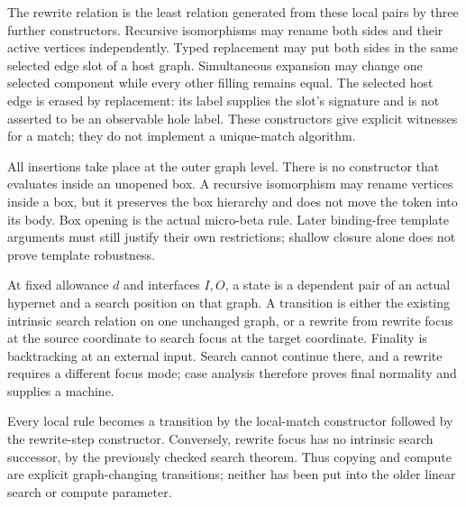 
The rewrite relation is the least relation generated from these local pairs
by three further constructors. Recursive isomorphisms may rename both sides
and their active vertices independently. Typed replacement may put both sides
in the same selected edge slot of a host graph. Simultaneous expansion may
change one selected component while every other filling remains equal. The
selected host edge is erased by replacement: its label supplies the slot's
signature and is not asserted to be an observable hole label. These
constructors give explicit witnesses for a match; they do not implement a
unique-match algorithm.

All insertions take place at the outer graph level. There is no constructor
that evaluates inside an unopened box. A recursive isomorphism may rename
vertices inside a box, but it preserves the box hierarchy and does not move
the token into its body. Box opening is the actual micro-beta rule. Later
binding-free template arguments must still justify their own restrictions;
shallow closure alone does not prove template robustness.


At fixed allowance $d$ and interfaces $I,O$, a state is a dependent pair
of an actual hypernet and a search position on that graph. A transition is
either the existing intrinsic search relation on one unchanged graph, or a
rewrite from rewrite focus at the source coordinate to search focus at the
target coordinate. Finality is backtracking at an external input. Search
cannot continue there, and a rewrite requires a different focus mode;
case analysis therefore proves final normality and supplies a machine.





Every local rule becomes a transition by the local-match constructor
followed by the rewrite-step constructor. Conversely, rewrite focus has no
intrinsic search successor, by the previously checked search theorem. Thus
copying and compute are explicit graph-changing transitions; neither has
been put into the older linear search or compute parameter.

